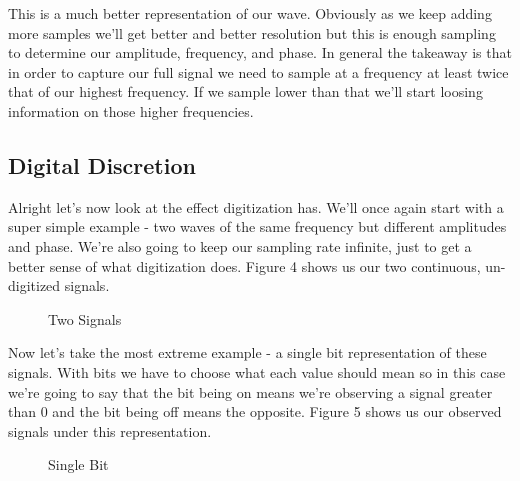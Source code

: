 \documentclass[12pt,a6paper]{book}
\begin{document}
This is a much better representation of our wave. Obviously as we keep adding more samples we'll get better and better resolution but this is enough sampling to determine our amplitude, frequency, and phase. In general the takeaway is that in order to capture our full signal we need to sample at a frequency at least twice that of our highest frequency. If we sample lower than that we'll start loosing information on those higher frequencies. 

\subsection{Digital Discretion}
Alright let's now look at the effect digitization has. We'll once again start with a super simple example - two waves of the same frequency but different amplitudes and phase. We're also going to keep our sampling rate infinite, just to get a better sense of what digitization does. Figure 4 shows us our two continuous, un-digitized signals. 

\begin{figure}[!htb]
\caption{\label{fig:my-label} Two Signals}
\end{figure}

Now let's take the most extreme example - a single bit representation of these signals. With bits we have to choose what each value should mean so in this case we're going to say that the bit being on means we're observing a signal greater than 0 and the bit being off means the opposite. Figure 5 shows us our observed signals under this representation. 

\begin{figure}[!htb]
\caption{\label{fig:my-label} Single Bit}
\end{figure}
\end{document}
